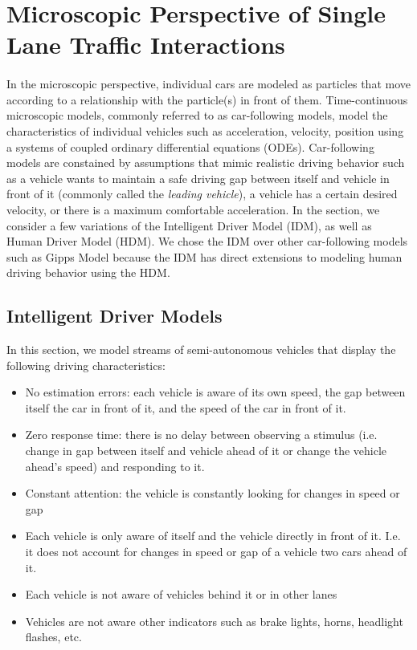 \documentclass[12pt]{article}
\begin{document}
\section{Microscopic Perspective of Single Lane Traffic Interactions}
\paragraph{} In the microscopic perspective, individual cars are modeled as particles that move according to a relationship with the particle(s) in front of them.  Time-continuous microscopic models, commonly referred to as car-following models, model the characteristics of individual vehicles such as acceleration, velocity, position using a systems of coupled ordinary differential equations (ODEs).  Car-following models are constained by assumptions that mimic realistic driving behavior such as a vehicle wants to maintain a safe driving gap between itself and vehicle in front of it (commonly called the \textit{leading vehicle}), a vehicle has a certain desired velocity, or there is a maximum comfortable acceleration. In the section, we consider a few variations of the Intelligent Driver Model (IDM), as well as Human Driver Model (HDM).  We chose the IDM over other car-following models such as Gipps Model because the IDM has direct extensions to modeling human driving behavior using the HDM.
\subsection{Intelligent Driver Models}
In this section, we model streams of semi-autonomous vehicles that display the following driving characteristics:
\begin{itemize}
  \item No estimation errors: each vehicle is aware of its own speed, the gap between itself the car in front of it, and the speed of the car in front of it.
  \item Zero response time: there is no delay between observing a stimulus (i.e. change in gap between itself and vehicle ahead of it or change the vehicle ahead's speed) and responding to it.
  \item Constant attention: the vehicle is constantly looking for changes in speed or gap
  \item Each vehicle is only aware of itself and the vehicle directly in front of it.  I.e. it does not account for changes in speed or gap of a vehicle two cars ahead of it.
  \item Each vehicle is not aware of vehicles behind it or in other lanes
  \item Vehicles are not aware other indicators such as brake lights, horns, headlight flashes, etc.
\end{itemize}
\end{document}
